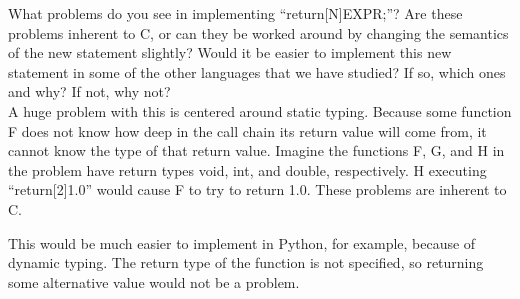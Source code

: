 \documentclass[10pt]{article}
\begin{document}
\begin{enumerate}
        What problems do you see in implementing ``return[N]EXPR;''? Are these problems inherent to C, or can they be worked
        around by changing the semantics of the new statement slightly? Would it be easier to implement this new statement in
        some of the other languages that we have studied? If so, which ones and why? If not, why not?\\

        A huge problem with this is centered around static typing. Because some function F does not know how deep in the call
        chain its return value will come from, it cannot know the type of that return value. Imagine the functions F, G, and H
        in the problem have return types void, int, and double, respectively. H executing ``return[2]1.0'' would cause F to try
        to return 1.0. These problems are inherent to C.

        This would be much easier to implement in Python, for example, because of dynamic typing. The return type of the
        function is not specified, so returning some alternative value would not be a problem.
\end{enumerate}
\end{document}
